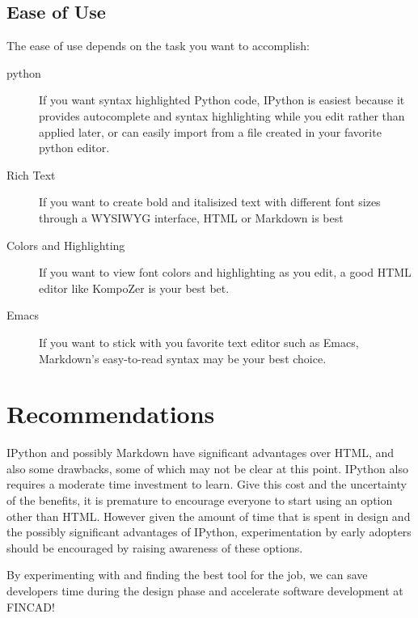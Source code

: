 \documentclass[]{article}
\begin{document}
\subsection{Ease of Use}
The ease of use depends on the task you want to accomplish:
\begin{description}
	\item[python] 
		If you want syntax highlighted Python code, IPython is easiest because it provides autocomplete and syntax highlighting while 
		you edit rather than applied later, or can easily import from a file created in your favorite python editor.
	\item[Rich Text] 
		If you want to create bold and italisized text with different font sizes through a WYSIWYG interface, HTML or Markdown is best
	\item[Colors and Highlighting] 
		If you want to view font colors and highlighting as you edit, a good HTML editor like KompoZer is your best bet.
	\item[Emacs]
		If you want to stick with you favorite text editor such as Emacs, Markdown's easy-to-read syntax may be your best choice.
\end{description}
	




\section{Recommendations}
	IPython and possibly Markdown have significant advantages over HTML, and also some drawbacks, some of which may not be clear at this point.  
	IPython also requires a moderate time investment to learn.  Give this cost and the uncertainty of the benefits, it is premature to encourage 
	everyone to start using an option other than HTML.  However given the amount of time that is spent in design and the possibly significant 
	advantages of IPython, experimentation by early adopters should be encouraged by raising awareness of these options.
	
	By experimenting with and finding the best tool for the job, 
	we can save developers time during the design phase and accelerate software development at FINCAD!
	
\end{document}
